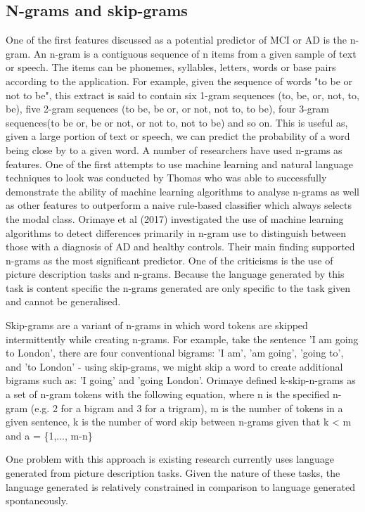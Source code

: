 \subsection{N-grams and skip-grams}
One of the first features discussed as a potential predictor of MCI or AD is the n-gram. An n-gram is a contiguous sequence of n items from a given sample of text or speech. The items can be phonemes, syllables, letters, words or base pairs according to the application. For example, given the sequence of words "to be or not to be", this extract is said to contain six 1-gram sequences (to, be, or, not, to, be), five 2-gram sequences (to be, be or, or not, not to, to be), four 3-gram sequences(to be or, be or not, or not to, not to be) and so on. This is useful as, given a large portion of text or speech, we can predict the probability of a word being close by to a given word. A number of researchers have used n-grams as features. One of the first attempts to use machine learning and natural language techniques to look was conducted by Thomas \cite{Thomas2005} who was able to successfully demonstrate the ability of machine learning algorithms to analyse n-grams as well as other features to outperform a naive rule-based classifier which always selects the modal class. Orimaye et al (2017) \cite{Orimaye2017} investigated the use of machine learning algorithms to detect differences primarily in n-gram use to distinguish between those with a diagnosis of AD and healthy controls. Their main finding supported n-grams as the most significant predictor. One of the criticisms is the use of picture description tasks and n-grams. Because the language generated by this task is content specific the n-grams generated are only specific to the task given and cannot be generalised. 
\par
Skip-grams are a variant of n-grams in which word tokens are skipped intermittently while creating n-grams. For example, take the sentence 'I am going to London', there are four conventional bigrams: 'I am', 'am going', 'going to', and 'to London' - using skip-grams, we might skip a word to create additional bigrams such as: 'I going' and 'going London'. 
Orimaye defined k-skip-n-grams as a set of n-gram tokens with the following equation, where n is the specified n-gram (e.g. 2 for a bigram and 3 for a trigram), m is the number of tokens in a given sentence, k is the number of word skip between n-grams given that k < m and a = \{1,..., m-n\}
\par 
One problem with this approach is existing research currently uses language generated from picture description tasks. Given the nature of these tasks, the language generated is relatively constrained in comparison to language generated spontaneously. 


